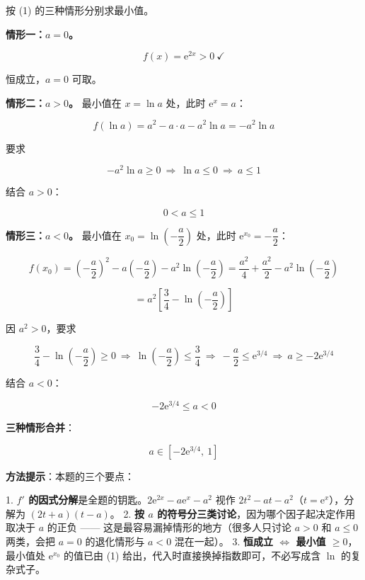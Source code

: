 \begin{answer}

按 (1) 的三种情形分别求最小值。

\textbf{情形一：$a=0$。}

\nopagebreak[4]
\[f(x)=\mathrm e^{2x}>0\ \checkmark\]

恒成立，$a=0$ 可取。

\textbf{情形二：$a>0$。} 最小值在 $x=\ln a$ 处，此时 $\mathrm e^{x}=a$：

\nopagebreak[4]
\[f(\ln a)=a^{2}-a\cdot a-a^{2}\ln a=-a^{2}\ln a\]

要求

\nopagebreak[4]
\[-a^{2}\ln a\ge0\ \Longrightarrow\ \ln a\le0\ \Longrightarrow\ a\le1\]

结合 $a>0$：

\nopagebreak[4]
\[0<a\le1\]

\textbf{情形三：$a<0$。} 最小值在 $x_0=\ln\left(-\dfrac a2\right)$ 处，此时 $\mathrm e^{x_0}=-\dfrac a2$：

\nopagebreak[4]
\[f\left(x_0\right)=\left(-\frac a2\right)^{2}-a\left(-\frac a2\right)-a^{2}\ln\left(-\frac a2\right)=\frac{a^{2}}4+\frac{a^{2}}2-a^{2}\ln\left(-\frac a2\right)\]

\nopagebreak[4]
\[=a^{2}\left[\frac34-\ln\left(-\frac a2\right)\right]\]

因 $a^{2}>0$，要求

\nopagebreak[4]
\[\frac34-\ln\left(-\frac a2\right)\ge0\ \Longrightarrow\ \ln\left(-\frac a2\right)\le\frac34\ \Longrightarrow\ -\frac a2\le\mathrm e^{3/4}\ \Longrightarrow\ a\ge-2\mathrm e^{3/4}\]

结合 $a<0$：

\nopagebreak[4]
\[-2\mathrm e^{3/4}\le a<0\]

\textbf{三种情形合并}：

\nopagebreak[4]
\[a\in\left[-2\mathrm e^{3/4},\ 1\right]\]

\begin{gktip}
\textbf{方法提示}：本题的三个要点：

1. \textbf{$f'$ 的因式分解}是全题的钥匙。$2\mathrm e^{2x}-a\mathrm e^{x}-a^{2}$ 视作 $2t^{2}-at-a^{2}$（$t=\mathrm e^{x}$），分解为 $(2t+a)(t-a)$。
2. \textbf{按 $a$ 的符号分三类讨论}，因为哪个因子起决定作用取决于 $a$ 的正负 —— 这是最容易漏掉情形的地方（很多人只讨论 $a>0$ 和 $a\le0$ 两类，会把 $a=0$ 的退化情形与 $a<0$ 混在一起）。
3. \textbf{恒成立 $\iff$ 最小值 $\ge0$}，最小值处 $\mathrm e^{x_0}$ 的值已由 (1) 给出，代入时直接换掉指数即可，不必写成含 $\ln$ 的复杂式子。
\end{gktip}


\end{answer}
